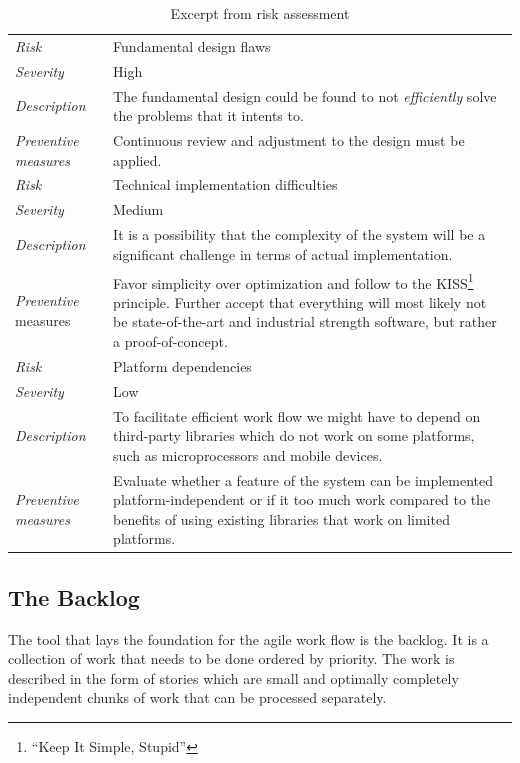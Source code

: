 \begin{table}[h]
  \centering
    \begin{tabular}{p{} p{}}
      \textit{Risk} & Fundamental design flaws \\
      \textit{Severity} & High \\
      \textit{Description} & The fundamental design could be found to not \textit{efficiently} solve the problems that it intents to. \\
      \textit{Preventive measures} & Continuous review and adjustment to the design must be applied. \\ \Xhline{2\arrayrulewidth}

      \textit{Risk} & Technical implementation difficulties \\
      \textit{Severity} & Medium \\
      \textit{Description} & It is a possibility that the complexity of the system will be a significant challenge in terms of actual implementation. \\
      \textit{Preventive} measures & Favor simplicity over optimization and follow to the KISS\footnote{``Keep It Simple, Stupid''} principle. Further accept that everything will most likely not be state-of-the-art and industrial strength software, but rather a proof-of-concept. \\ \Xhline{2\arrayrulewidth}

      \textit{Risk} & Platform dependencies \\
      \textit{Severity} & Low \\
      \textit{Description} & To facilitate efficient work flow we might have to depend on third-party libraries which do not work on some platforms, such as microprocessors and mobile devices. \\
      \textit{Preventive measures} & Evaluate whether a feature of the system can be implemented platform-independent or if it too much work compared to the benefits of using existing libraries that work on limited platforms.
    \end{tabular}
    \caption{Excerpt from risk assessment}
    \label{tbl:risk-assessment}
\end{table}

\subsection{The Backlog}
\label{sec:project-mgmt:backlog}

The tool that lays the foundation for the agile work flow is the backlog. It is
a collection of work that needs to be done ordered by priority. The work is
described in the form of stories which are small and optimally completely
independent chunks of work that can be processed separately.

